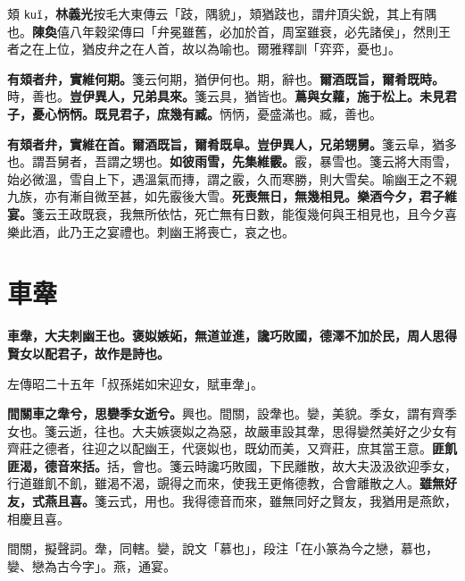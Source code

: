 \begin{quoting}頍 \texttt{kuǐ}，\textbf{林義光}按毛大東傳云「跂，隅貌」，頍猶跂也，謂弁頂尖銳，其上有隅也。\textbf{陳奐}僖八年穀梁傳曰「弁冕雖舊，必加於首，周室雖衰，必先諸侯」，然則王者之在上位，猶皮弁之在人首，故以為喻也。爾雅釋訓「弈弈，憂也」。\end{quoting}

\textbf{有頍者弁，實維何期。}{\footnotesize 箋云何期，猶伊何也。期，辭也。}\textbf{爾酒既旨，爾肴既時。}{\footnotesize 時，善也。}\textbf{豈伊異人，兄弟具來。}{\footnotesize 箋云具，猶皆也。}\textbf{蔦與女蘿，施于松上。未見君子，憂心怲怲。既見君子，庶幾有臧。}{\footnotesize 怲怲，憂盛滿也。臧，善也。}

\textbf{有頍者弁，實維在首。爾酒既旨，爾肴既阜。豈伊異人，兄弟甥舅。}{\footnotesize 箋云阜，猶多也。謂吾舅者，吾謂之甥也。}\textbf{如彼雨雪，先集維霰。}{\footnotesize 霰，暴雪也。箋云將大雨雪，始必微溫，雪自上下，遇溫氣而摶，謂之霰，久而寒勝，則大雪矣。喻幽王之不親九族，亦有漸自微至甚，如先霰後大雪。}\textbf{死喪無日，無幾相見。樂酒今夕，君子維宴。}{\footnotesize 箋云王政既衰，我無所依怙，死亡無有日數，能復幾何與王相見也，且今夕喜樂此酒，此乃王之宴禮也。刺幽王將喪亡，哀之也。}

\section{車舝}


\textbf{車舝，大夫刺幽王也。褒姒嫉妬，無道並進，讒巧敗國，德澤不加於民，周人思得賢女以配君子，故作是詩也。}

\begin{quoting}左傳昭二十五年「叔孫婼如宋迎女，賦車舝」。\end{quoting}

\textbf{間關車之舝兮，思孌季女逝兮。}{\footnotesize 興也。間關，設舝也。孌，美貌。季女，謂有齊季女也。箋云逝，往也。大夫嫉褒姒之為惡，故嚴車設其舝，思得孌然美好之少女有齊莊之德者，往迎之以配幽王，代褒姒也，既幼而美，又齊莊，庶其當王意。}\textbf{匪飢匪渴，德音來括。}{\footnotesize 括，會也。箋云時讒巧敗國，下民離散，故大夫汲汲欲迎季女，行道雖飢不飢，雖渴不渴，覬得之而來，使我王更脩德教，合會離散之人。}\textbf{雖無好友，式燕且喜。}{\footnotesize 箋云式，用也。我得德音而來，雖無同好之賢友，我猶用是燕飲，相慶且喜。}

\begin{quoting}間關，擬聲詞。舝，同轄。孌，說文「慕也」，段注「在小篆為今之戀，慕也，孌、戀為古今字」。燕，通宴。\end{quoting}

